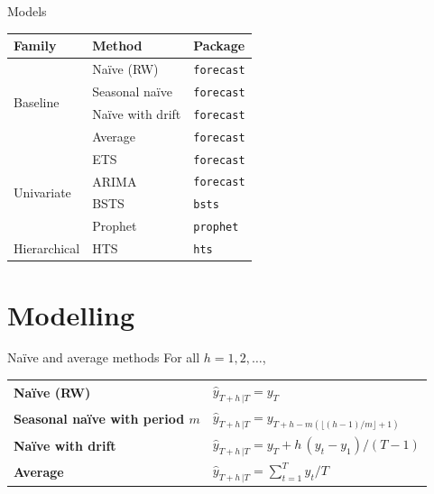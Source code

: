 \documentclass[12pt,aspectratio=169]{beamer}
\begin{document}
\begin{frame}{Models}
    \centering%
    \begin{tabular}{lll}
        \toprule
        \textbf{Family}               & \textbf{Method}  & \textbf{Package} \\
        \midrule
        \multirow{4}{*}{Baseline}     & Naïve (RW)       & \texttt{forecast} \\
                                      & Seasonal naïve   & \texttt{forecast} \\
                                      & Naïve with drift & \texttt{forecast} \\
                                      & Average          & \texttt{forecast} \\
        \midrule
        \multirow{4}{*}{Univariate}   & ETS              & \texttt{forecast} \\
                                      & ARIMA            & \texttt{forecast} \\
                                      & BSTS             & \texttt{bsts} \\
                                      & Prophet          & \texttt{prophet} \\
        \midrule
        \multirow{1}{*}{Hierarchical} & HTS              & \texttt{hts} \\
        \bottomrule
    \end{tabular}
\end{frame}

\section{Modelling}

\begin{frame}{Naïve and average methods}
    For all $h = 1, 2, \ldots$,
    \begin{center}
        \renewcommand{\arraystretch}{1.5}%
        \begin{tabular}{ll}
            \toprule
            \textbf{Naïve (RW)}                     & $\hat{y}_{T + h\,| T} = y_{T}$ \\
            \textbf{Seasonal naïve with period $m$} & $\hat{y}_{T + h\,| T} = y_{T+h-m(\lfloor (h-1)/m \rfloor+1)}$ \\
            \textbf{Naïve with drift}               & $\hat{y}_{T + h\,| T} = y_{T} + h\,(y_{t} - y_{1}) / (T - 1)$ \\
            \textbf{Average}                        & $\hat{y}_{T + h\,| T} = \sum_{t = 1}^{T} y_{t} / T$ \\
            \bottomrule
        \end{tabular}
    \end{center}
\end{frame}
\end{document}
